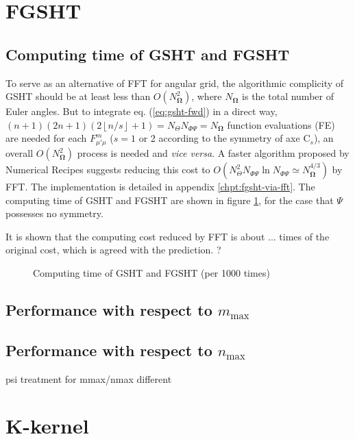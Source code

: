 \section{FGSHT}


\subsection{Computing time of GSHT and FGSHT}

To serve as an alternative of FFT for angular grid, the algorithmic
complicity of GSHT should be at least less than $O(N_{\mathbf{\Omega}}^{2})$,
where $N_{\mathbf{\Omega}}$ is the total number of Euler angles.
But to integrate eq. (\ref{eq:gsht-fwd}) in a direct way, $(n+1)(2n+1)(2\left\lfloor n/s\right\rfloor +1)=N_{\Theta}N_{\Phi\Psi}=N_{\mathbf{\Omega}}$
function evaluations (FE) are needed for each $F_{\mu'\mu}^{m}$ ($s=1$
or 2 according to the symmetry of axe $\mathrm{C}_{s}$), an overall
$O(N_{\mathbf{\Omega}}^{2})$ process is needed and \textit{vice versa}.
A faster algorithm proposed by Numerical Recipes \citep{Numerical_Recipes_3ed}
suggests reducing this cost to $O(N_{\Theta}^{2}N_{\Phi\Psi}\ln N_{\Phi\Psi}\simeq N_{\mathbf{\Omega}}^{4/3})$
by FFT. The implementation is detailed in appendix \ref{chpt:fgsht-via-fft}.
The computing time of GSHT and FGSHT are shown in figure \ref{fig:time-gsht-fgsht},
for the case that $\Psi$ possesses no symmetry.

It is shown that the computing cost reduced by FFT is about ... times
of the original cost, which is agreed with the prediction. ? 

\begin{figure}[h]
\caption{Computing time of GSHT and FGSHT (per 1000 times)\label{fig:time-gsht-fgsht}}
\end{figure}



\subsection{Performance with respect to $m_{\max}$}


\subsection{Performance with respect to $n_{\max}$}

psi treatment for mmax/nmax different


\section{K-kernel}


